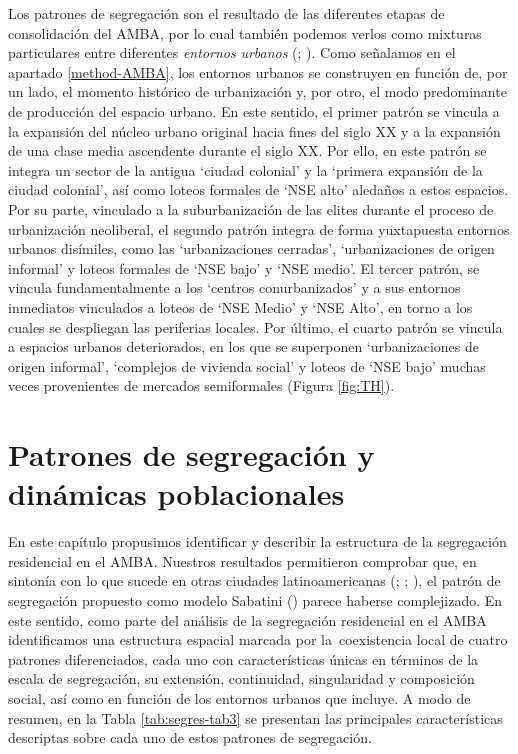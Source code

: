 \documentclass[
  spanish,
  a4paper,%
  chapterprefix=true,%
  DIV=calc,%
  twoside]{scrbook}%
\begin{document}
Los patrones de segregación son el resultado de las diferentes etapas de
consolidación del AMBA, por lo cual también podemos verlos como mixturas
particulares entre diferentes \emph{entornos} \emph{urbanos} (; ). Como señalamos en el apartado \ref{method-AMBA}, los
entornos urbanos se construyen en función de, por un lado, el momento
histórico de urbanización y, por otro, el modo predominante de
producción del espacio urbano. En este sentido, el primer patrón se
vincula a la expansión del núcleo urbano original hacia fines del siglo
XX y a la expansión de una clase media ascendente durante el siglo XX.
Por ello, en este patrón se integra un sector de la antigua `ciudad
colonial' y la `primera expansión de la ciudad colonial', así como
loteos formales de `NSE alto' aledaños a estos espacios. Por su parte,
vinculado a la suburbanización de las elites durante el proceso de
urbanización neoliberal, el segundo patrón integra de forma yuxtapuesta
entornos urbanos disímiles, como las `urbanizaciones cerradas',
`urbanizaciones de origen informal' y loteos formales de `NSE bajo' y
`NSE medio'. El tercer patrón, se vincula fundamentalmente a los
`centros conurbanizados' y a sus entornos inmediatos vinculados a loteos
de `NSE Medio' y `NSE Alto', en torno a los cuales se despliegan las
periferias locales. Por último, el cuarto patrón se vincula a espacios
urbanos deteriorados, en los que se superponen `urbanizaciones de origen
informal', `complejos de vivienda social' y loteos de `NSE bajo' muchas
veces provenientes de mercados semiformales (Figura \ref{fig:TH}).

\section{Patrones de segregación y dinámicas poblacionales}\label{residential-conclussion}

En este capítulo propusimos identificar y describir la estructura de la
segregación residencial en el AMBA. Nuestros resultados permitieron
comprobar que, en sintonía con lo que sucede en otras ciudades
latinoamericanas (; ; ), el
patrón de segregación propuesto como modelo Sabatini () parece haberse
complejizado. En este sentido, como parte del análisis de la segregación
residencial en el AMBA identificamos una estructura espacial marcada por
la~coexistencia local de cuatro patrones diferenciados, cada uno con
características únicas en términos de la escala de segregación, su
extensión, continuidad, singularidad y composición social, así como en
función de los entornos urbanos que incluye. A modo de resumen, en la
Tabla \ref{tab:segres-tab3} se presentan las principales
características descriptas sobre cada uno de estos patrones de
segregación.
\end{document}
